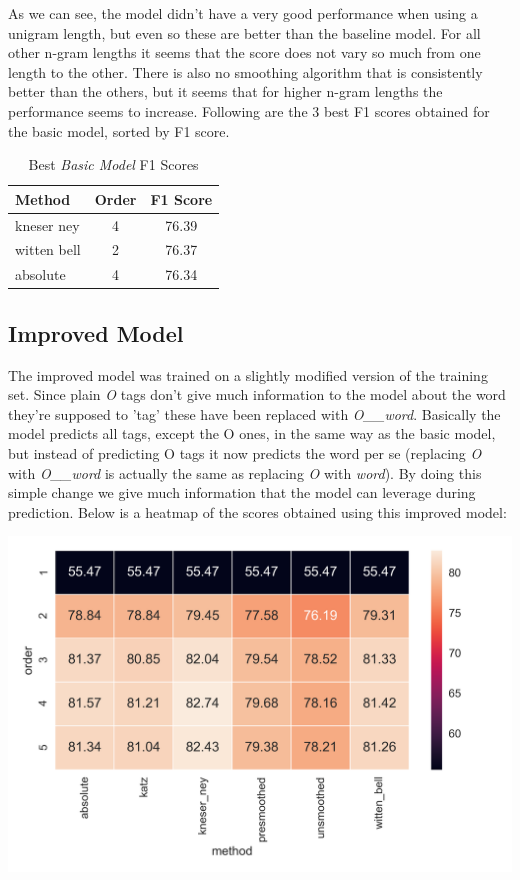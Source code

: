 \documentclass[11pt,a4paper]{article}
\begin{document}
	As we can see, the model didn't have a very good performance when using a unigram length, but even so these are better than the baseline model. For all other n-gram lengths it seems that the score does not vary so much from one length to the other. There is also no smoothing algorithm that is consistently better than the others, but it seems that for higher n-gram lengths the performance seems to increase. Following are the 3 best F1 scores obtained for the basic model, sorted by F1 score.
	
		
	\begin{table}[h]
		\centering
		\begin{tabularx}{155pt}{l | c | c}

			\textbf{Method} & \textbf{Order} & \textbf{F1 Score} \\
			\hline 
			kneser ney & 4 & 76.39 \\
			\hline
			witten bell & 2 & 76.37 \\
			absolute & 4 & 76.34 \\
			
		\end{tabularx} 
		\caption{Best \textit{Basic Model} F1 Scores}
		\label{table:basic-method-scores}	
	\end{table}
	
		
\subsection{Improved Model}
	
	The improved model was trained on a slightly modified version of the training set. Since plain \textit{O} tags don't give much information to the model about the word they're supposed to 'tag' these have been replaced with \textit{O\_\_word}. Basically the model predicts all tags, except the O ones, in the same way as the basic model, but instead of predicting O tags it now predicts the word per se (replacing \textit{O} with \textit{O\_\_word} is actually the same as replacing \textit{O} with \textit{word}). By doing this simple change we give much information that the model can leverage during prediction. Below is a heatmap of the scores obtained using this improved model:
	
	\hspace*{-0.6cm}\includegraphics[scale=0.6]{scores_heatmap_w2iob__w}
\end{document}

